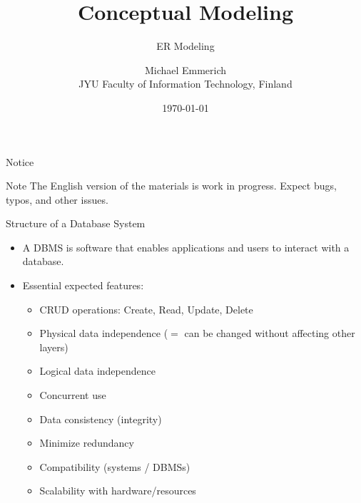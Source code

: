 \documentclass[10pt,aspectratio=169]{beamer}
\title{Conceptual Modeling}
\subtitle{ER Modeling}
\author{Michael Emmerich\\JYU Faculty of Information Technology, Finland}
\date{\today}
\begin{document}
\begin{frame}
  \titlepage
\end{frame}

\begin{frame}{Notice}
\begin{block}{Note}
The English version of the materials is work in progress. Expect bugs, typos, and other issues.
\end{block}
\end{frame}

\begin{frame}{Structure of a Database System}
\begin{itemize}
  \item A DBMS is software that enables applications and users to interact with a database.
  \item Essential expected features:
  \begin{itemize}
    \item CRUD operations: Create, Read, Update, Delete
    \item Physical data independence ($=$ can be changed without affecting other layers)
    \item Logical data independence
    \item Concurrent use
    \item Data consistency (integrity)
    \item Minimize redundancy
    \item Compatibility (systems / DBMSs)
    \item Scalability with hardware/resources
  \end{itemize}
\end{itemize}
\end{frame}
\end{document}
